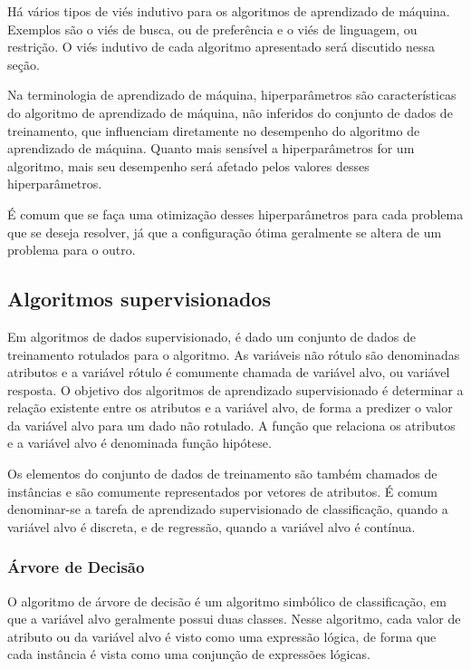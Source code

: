 \documentclass{article}
\begin{document}
Há vários tipos de viés indutivo para os algoritmos de aprendizado de máquina.
Exemplos são o viés de busca, ou de preferência e o viés de linguagem, ou restrição.
O viés indutivo de cada algoritmo apresentado será discutido nessa seção.

Na terminologia de aprendizado de máquina, hiperparâmetros são características do algoritmo de aprendizado de máquina,
não inferidos do conjunto de dados de treinamento, que influenciam diretamente no desempenho do algoritmo de aprendizado de máquina.
Quanto mais sensível a hiperparâmetros for um algoritmo, mais seu desempenho será afetado pelos valores desses hiperparâmetros.

É comum que se faça uma otimização desses hiperparâmetros para cada problema que se deseja resolver,
já que a configuração ótima geralmente se altera de um problema para o outro.

\subsection{Algoritmos supervisionados}

Em algoritmos de dados supervisionado, é dado um conjunto de dados de treinamento rotulados para o algoritmo.
As variáveis não rótulo são denominadas atributos e a variável rótulo é comumente chamada de variável alvo, ou variável resposta.
O objetivo dos algoritmos de aprendizado supervisionado é determinar a relação existente entre os atributos e a variável alvo,
de forma a predizer o valor da variável alvo para um dado não rotulado.
A função que relaciona os atributos e a variável alvo é denominada função hipótese.

Os elementos do conjunto de dados de treinamento são também chamados de instâncias e são comumente representados por vetores de atributos.
É comum denominar-se a tarefa de aprendizado supervisionado de classificação, quando a variável alvo é discreta, e de regressão, quando a variável alvo é contínua.

\subsubsection{Árvore de Decisão}

O algoritmo de árvore de decisão é um algoritmo simbólico de classificação, em que a variável alvo geralmente possui duas classes.
Nesse algoritmo, cada valor de atributo ou da variável alvo é visto como uma expressão lógica, de forma que cada instância é vista como uma conjunção de expressões lógicas.
\end{document}
